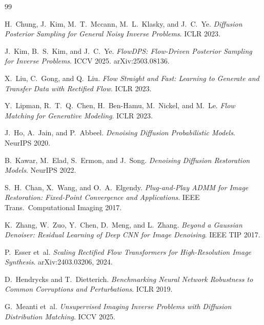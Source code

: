 \documentclass{article}
\begin{document}
\begin{thebibliography}{99}

H.~Chung, J.~Kim, M.~T.~Mccann, M.~L.~Klasky, and J.~C.~Ye.
\emph{Diffusion Posterior Sampling for General Noisy Inverse Problems}.
ICLR 2023.

J.~Kim, B.~S.~Kim, and J.~C.~Ye.
\emph{FlowDPS: Flow-Driven Posterior Sampling for Inverse Problems}.
ICCV 2025. arXiv:2503.08136.

X.~Liu, C.~Gong, and Q.~Liu.
\emph{Flow Straight and Fast: Learning to Generate and Transfer Data
with Rectified Flow}. ICLR 2023.

Y.~Lipman, R.~T.~Q.~Chen, H.~Ben-Hamu, M.~Nickel, and M.~Le.
\emph{Flow Matching for Generative Modeling}. ICLR 2023.

J.~Ho, A.~Jain, and P.~Abbeel.
\emph{Denoising Diffusion Probabilistic Models}. NeurIPS 2020.

B.~Kawar, M.~Elad, S.~Ermon, and J.~Song.
\emph{Denoising Diffusion Restoration Models}. NeurIPS 2022.

S.~H.~Chan, X.~Wang, and O.~A.~Elgendy.
\emph{Plug-and-Play ADMM for Image Restoration: Fixed-Point Convergence
and Applications}. IEEE Trans.~Computational Imaging 2017.

K.~Zhang, W.~Zuo, Y.~Chen, D.~Meng, and L.~Zhang.
\emph{Beyond a Gaussian Denoiser: Residual Learning of Deep CNN for
Image Denoising}. IEEE TIP 2017.

P.~Esser et~al.
\emph{Scaling Rectified Flow Transformers for High-Resolution Image
Synthesis}. arXiv:2403.03206, 2024.

D.~Hendrycks and T.~Dietterich.
\emph{Benchmarking Neural Network Robustness to Common Corruptions and
Perturbations}. ICLR 2019.

G.~Meanti et~al.
\emph{Unsupervised Imaging Inverse Problems with Diffusion Distribution
Matching}. ICCV 2025.


\end{thebibliography}
\end{document}
